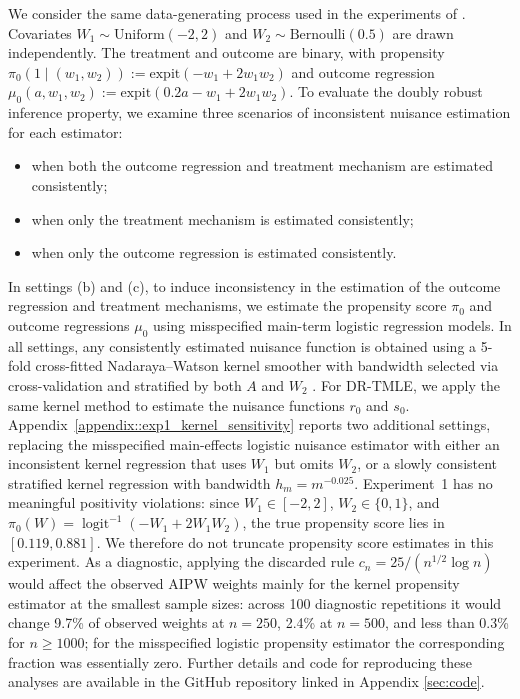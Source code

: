 \documentclass[11pt]{article}
\theoremstyle{plain}
\begin{document}
We consider the same data-generating process used in the experiments of \cite{benkeser2017doubly}. Covariates \( W_1 \sim \text{Uniform}(-2, 2) \) and \( W_2 \sim \text{Bernoulli}(0.5) \) are drawn independently. The treatment and outcome are binary, with propensity \( \pi_0(1 \mid (w_1, w_2)) := \text{expit}(-w_1 + 2w_1 w_2) \) and outcome regression \( \mu_0(a, w_1, w_2) := \text{expit}(0.2a - w_1 + 2w_1 w_2) \). To evaluate the doubly robust inference property, we examine three scenarios of inconsistent nuisance estimation for each estimator:
\begin{itemize}
\item[(a)] when both the outcome regression and treatment mechanism are estimated consistently;\vspace{-.15in}
\item[(b)] when only the treatment mechanism is estimated consistently;\vspace{-.15in}
\item[(c)] when only the outcome regression is estimated consistently.
\end{itemize}
In settings (b) and (c), to induce inconsistency in the estimation of the outcome regression and treatment mechanisms, we estimate the propensity score \( \pi_0 \) and outcome regressions \( \mu_0 \) using misspecified main-term logistic regression models. In all settings, any consistently estimated nuisance function is obtained using a 5-fold cross-fitted Nadaraya–Watson kernel smoother with bandwidth selected via cross-validation and stratified by both \( A \) and \( W_2 \)  \citep{hofmeyr2020fast}. For DR-TMLE, we apply the same kernel method to estimate the nuisance functions \( r_0 \) and \( s_0 \). Appendix~\ref{appendix::exp1_kernel_sensitivity} reports two additional settings, replacing the misspecified main-effects logistic nuisance estimator with either an inconsistent kernel regression that uses \(W_1\) but omits \(W_2\), or a slowly consistent stratified kernel regression with bandwidth \(h_m=m^{-0.025}\). {\color{purple} Experiment~1 has no meaningful positivity violations: since \(W_1 \in [-2,2]\), \(W_2 \in \{0,1\}\), and \(\pi_0(W)=\operatorname{logit}^{-1}(-W_1+2W_1W_2)\), the true propensity score lies in \([0.119,0.881]\). We therefore do not truncate propensity score estimates in this experiment. As a diagnostic, applying the discarded rule \(c_n=25/(n^{1/2}\log n)\) would affect the observed AIPW weights mainly for the kernel propensity estimator at the smallest sample sizes: across 100 diagnostic repetitions it would change 9.7\% of observed weights at \(n=250\), 2.4\% at \(n=500\), and less than 0.3\% for \(n\ge1000\); for the misspecified logistic propensity estimator the corresponding fraction was essentially zero.} Further details and code for reproducing these analyses are available in the GitHub repository linked in Appendix \ref{sec:code}.
\end{document}

